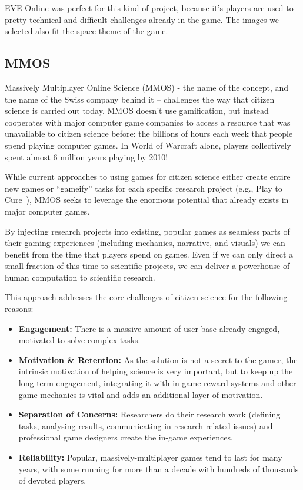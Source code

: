 	EVE Online was perfect for this kind of project, because it's players are used to pretty technical and difficult challenges already in the game. The images we selected also fit the space theme of the game.

\subsection{MMOS}

	Massively Multiplayer Online Science (MMOS) - the name of the concept, and the name of the Swiss company behind it – challenges the way that citizen science is	carried out today. MMOS doesn’t use gamification, but instead cooperates with major	computer game companies to access a resource that was unavailable to citizen science before: the billions of hours each week that people spend playing computer	games. In World of Warcraft alone, players collectively spent almost 6 million years playing by 2010!

	While current approaches to using games for citizen science either create entire new games or ``gameify'' tasks for each specific research project (e.g., Play to Cure~\cite{playtocure}), MMOS seeks to leverage the enormous potential that already exists in major computer games. 

	By injecting research projects into existing, popular games as seamless parts of their gaming experiences (including mechanics, narrative, and visuals) we can benefit from the time that players spend on games. Even if we can only direct a small fraction of this time to scientific projects, we can deliver a powerhouse of human computation to scientific research.

	This approach addresses the core challenges of citizen science for the following reasons:

	\begin{itemize}
	  \item {\bf Engagement:} There is a massive amount of user base already engaged, motivated to
	  solve complex tasks.
	  \item {\bf Motivation \& Retention:} As the solution is not a secret to the gamer, the intrinsic motivation of
	  helping science is very important, but to keep up the long-term engagement,
	  integrating it with in-game reward systems and other game mechanics is vital
	  and adds an additional layer of motivation.
	  \item {\bf Separation of Concerns:} Researchers do their research work
	  (defining tasks, analysing results, communicating in research related issues)
	  and professional game designers create the in-game experiences.
	  \item {\bf Reliability:} Popular, massively-multiplayer games tend to last for many years, with some running for more than a decade
	  with hundreds of thousands of devoted players.
	\end{itemize}

